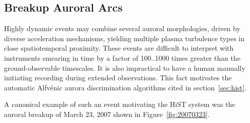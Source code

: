 \FloatBarrier
\subsection{Breakup Auroral Arcs}\label{sec:breakup}
Highly dynamic events may combine several auroral morphologies, driven by diverse acceleration mechanisms, yielding multiple plasma turbulence types in close spatiotemporal proximity.
These events are difficult to interpret with instruments smearing in time by a factor of 100..1000 times greater than the ground-observable timescales.
It is also impractical to have a human manually initiating recording during extended observations.
This fact motivates the automatic Alfvénic aurora discrimination algorithms cited in section~\ref{sec:hist}.

A canonical example of such an event motivating the HiST system was the auroral breakup of March 23, 2007 shown in Figure~\ref{fig:20070323}.
